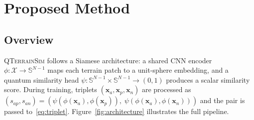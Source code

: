 \documentclass[conference,a4paper]{IEEEtran}
\newcommand{\qts}{\textsc{QTerrainSim}}
\begin{document}
\section{Proposed Method}
\label{sec:method}

\subsection{Overview}

\qts{} follows a Siamese architecture: a shared CNN encoder
$\phi\colon \mathcal{X} \to \mathbb{S}^{N-1}$ maps each terrain patch to
a unit-sphere embedding, and a quantum similarity head
$\psi\colon \mathbb{S}^{N-1}\times\mathbb{S}^{N-1}\to (0,1)$ produces a
scalar similarity score.
During training, triplets $(\mathbf{x}_a, \mathbf{x}_p, \mathbf{x}_n)$
are processed as
$(s_{ap}, s_{an}) =
(\psi(\phi(\mathbf{x}_a),\phi(\mathbf{x}_p)),\;
\psi(\phi(\mathbf{x}_a),\phi(\mathbf{x}_n)))$
and the pair is passed to~\eqref{eq:triplet}.
Figure~\ref{fig:architecture} illustrates the full pipeline.
\end{document}
